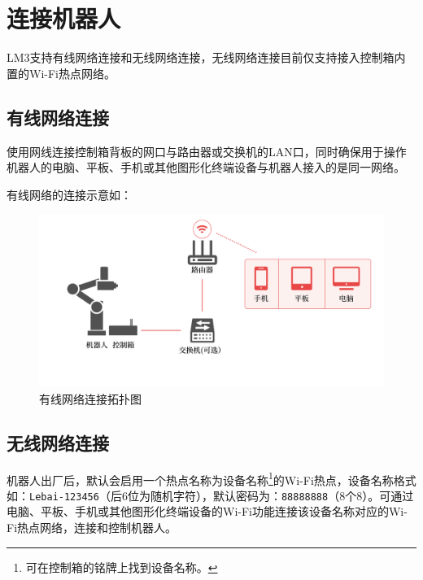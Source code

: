 

\section{连接机器人}
LM3支持有线网络连接和无线网络连接，无线网络连接目前仅支持接入控制箱内置的Wi-Fi热点网络。
\subsection{有线网络连接}

使用网线连接控制箱背板的网口与路由器或交换机的LAN口，同时确保用于操作机器人的电脑、平板、手机或其他图形化终端设备与机器人接入的是同一网络。

有线网络的连接示意如：

\begin{figure}[ht]
    \centering
    \includegraphics[width=\textwidth]{image/network-1.pdf}
    \caption{有线网络连接拓扑图}
    \label{fig:有线网络连接拓扑图}
\end{figure}


\subsection{无线网络连接}
机器人出厂后，默认会启用一个热点名称为设备名称\footnote{可在控制箱的铭牌上找到设备名称。}的Wi-Fi热点，设备名称格式如：\verb|Lebai-123456|（后6位为随机字符），默认密码为：\verb|88888888|（8个8）。可通过电脑、平板、手机或其他图形化终端设备的Wi-Fi功能连接该设备名称对应的Wi-Fi热点网络，连接和控制机器人。

